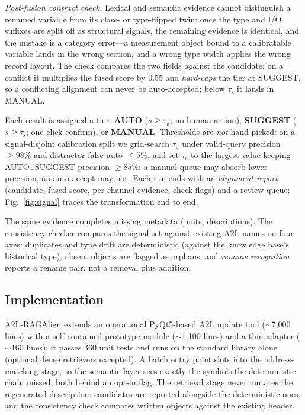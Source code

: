 \documentclass[conference]{IEEEtran}
\newcommand{\toolname}{A2L-RAGAlign}
\begin{document}
\emph{Post-fusion contract check.} Lexical and semantic evidence cannot
distinguish a renamed variable from its class- or type-flipped twin: once the
type and I/O suffixes are split off as structural signals, the remaining
evidence is identical, and the mistake is a category error---a measurement
object bound to a calibratable variable lands in the wrong section, and a
wrong type width applies the wrong record layout. The check compares the two
fields against the candidate: on a conflict it multiplies the fused score by
0.55 and \emph{hard-caps} the tier at SUGGEST, so a conflicting alignment can
never be auto-accepted; below $\tau_{\mathrm{s}}$ it lands in MANUAL.

Each result is assigned a tier: \textbf{AUTO} ($s \geq \tau_{\mathrm{a}}$;
no human action), \textbf{SUGGEST} ($s \geq \tau_{\mathrm{s}}$; one-click
confirm), or \textbf{MANUAL}. Thresholds are \emph{not} hand-picked: on a
signal-disjoint calibration split we grid-search $\tau_{\mathrm{a}}$ under
valid-query precision $\geq 98\%$ and distractor false-auto $\leq 5\%$, and
set $\tau_{\mathrm{s}}$ to the largest value keeping AUTO$\cup$SUGGEST
precision $\geq 85\%$: a manual queue may absorb lower precision, an
auto-accept may not. Each run ends with an \emph{alignment report}
(candidate, fused score, per-channel evidence, check flags) and a review
queue; Fig.~\ref{fig:signal} traces the transformation end to end.

The same evidence completes missing metadata (units, descriptions). The
consistency checker compares the signal set against existing A2L names on
four axes: duplicates and type drift are deterministic (against the
knowledge base's historical type), absent objects are flagged as orphans, and
\emph{rename recognition} reports a rename pair, not a removal plus addition.

\subsection{Implementation}
\label{sec:implementation}
\toolname{} extends an operational PyQt5-based A2L update tool ($\sim$7{,}000
lines) with a self-contained prototype module ($\sim$1{,}100 lines) and a thin
adapter ($\sim$160 lines); it passes 360 unit tests and runs on the standard
library alone (optional dense retrievers excepted). A batch entry point slots
into the address-matching stage, so the semantic layer sees exactly the
symbols the deterministic chain missed, both behind an opt-in flag. The
retrieval stage never mutates the regenerated description: candidates are
reported alongside the deterministic ones, and the consistency check compares
written objects against the existing header.
\end{document}

